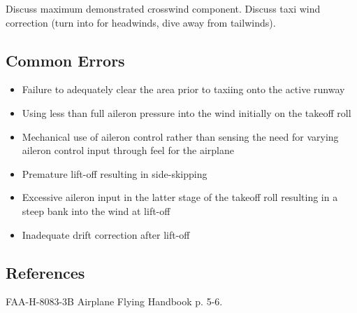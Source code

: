 Discuss maximum demonstrated crosswind component. Discuss taxi wind correction
(turn into for headwinds, dive away from tailwinds).

\subsection{Common Errors}

\begin{itemize}
  \item Failure to adequately clear the area prior to taxiing onto the active
    runway
  \item Using less than full aileron pressure into the wind initially on the
    takeoff roll
  \item Mechanical use of aileron control rather than sensing the need for
    varying aileron control input through feel for the airplane
  \item Premature lift-off resulting in side-skipping
  \item Excessive aileron input in the latter stage of the takeoff roll
    resulting in a steep bank into the wind at lift-off
  \item Inadequate drift correction after lift-off
\end{itemize}

\subsection{References}

FAA-H-8083-3B Airplane Flying Handbook p. 5-6.

